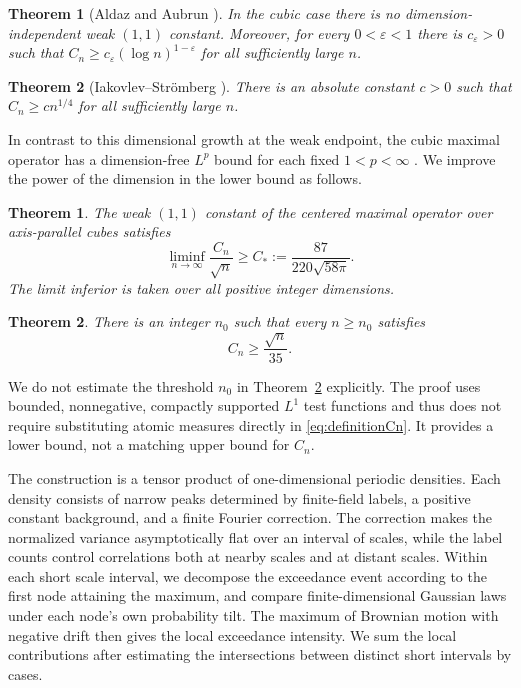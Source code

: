 \documentclass[a4paper,11pt]{article}
\newtheorem{historical}{Theorem}
\newtheorem{theorem}{Theorem}
\theoremstyle{remark}
\begin{document}
\begin{historical}[Aldaz and Aubrun \cite{Aldaz2011,Aubrun2009}]
In the cubic case there is no dimension-independent weak $(1,1)$ constant. Moreover, for every $0<\varepsilon<1$ there is $c_\varepsilon>0$ such that
$C_n\ge c_\varepsilon(\log n)^{1-\varepsilon}$ for all sufficiently large $n$.
\end{historical}

\begin{historical}[Iakovlev--Strömberg \cite{IS2013}]
There is an absolute constant $c>0$ such that $C_n\ge c n^{1/4}$ for all sufficiently large $n$.
\end{historical}

In contrast to this dimensional growth at the weak endpoint, the cubic maximal operator has a dimension-free $L^p$ bound for each fixed $1<p<\infty$ \cite{Bourgain2012}.
We improve the power of the dimension in the lower bound as follows.

\begin{theorem}\label{thm:main}
The weak $(1,1)$ constant of the centered maximal operator over axis-parallel cubes satisfies
\begin{equation}\label{eq:mainconstant}
 \liminf_{n\to\infty}\frac{C_n}{\sqrt n}
 \ge C_*:=\frac{87}{220\sqrt{58\pi}}.
\end{equation}
The limit inferior is taken over all positive integer dimensions.
\end{theorem}

\begin{theorem}\label{thm:rational}
There is an integer $n_0$ such that every $n\ge n_0$ satisfies
\[
 C_n\ge\frac{\sqrt n}{35}.
\]
\end{theorem}

We do not estimate the threshold $n_0$ in Theorem~\ref{thm:rational} explicitly.
The proof uses bounded, nonnegative, compactly supported $L^1$ test functions and thus does not require substituting atomic measures directly in \eqref{eq:definitionCn}. It provides a lower bound, not a matching upper bound for $C_n$.

The construction is a tensor product of one-dimensional periodic densities. Each density consists of narrow peaks determined by finite-field labels, a positive constant background, and a finite Fourier correction.
The correction makes the normalized variance asymptotically flat over an interval of scales, while the label counts control correlations both at nearby scales and at distant scales.
Within each short scale interval, we decompose the exceedance event according to the first node attaining the maximum, and compare finite-dimensional Gaussian laws under each node's own probability tilt. The maximum of Brownian motion with negative drift then gives the local exceedance intensity. We sum the local contributions after estimating the intersections between distinct short intervals by cases.
\end{document}
